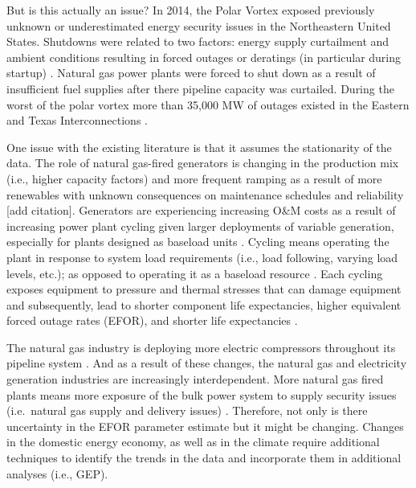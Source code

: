 \documentclass[10pt]{amsart}
\begin{document}
	But is this actually an issue?
	In 2014, the Polar Vortex exposed previously unknown or underestimated energy security issues in the Northeastern United States. 
	Shutdowns were related to two factors: energy supply curtailment and ambient conditions resulting in forced outages or deratings (in particular during startup) \parencite{gugel2015polar}.
	Natural gas power plants were forced to shut down as a result of insufficient fuel supplies after there pipeline capacity was curtailed.
	During the worst of the polar vortex more than 35,000 MW of outages existed in the Eastern and Texas Interconnections \parencite{gugel2015polar}.  
	
	One issue with the existing literature is that it assumes the stationarity of the data. 
	The role of natural gas-fired generators is changing in the production mix (i.e., higher capacity factors) and more frequent ramping as a result of more renewables with unknown consequences on maintenance schedules and reliability [add citation].
	Generators are experiencing increasing O\&M costs as a result of increasing power plant cycling given larger deployments of variable generation, especially for plants designed as baseload units \parencite{nrel:2012aa}. 
	Cycling means operating the plant in response to system load requirements (i.e., load following, varying load levels, etc.); as opposed to operating it as a baseload resource \parencite{nerc:2012aa}.
	Each cycling exposes equipment to pressure and thermal stresses that can damage equipment and subsequently, lead to shorter component life expectancies, higher equivalent forced outage rates (EFOR), and shorter life expectancies \parencite{nerc:2012aa}. 
	 
	The natural gas industry is deploying more electric compressors throughout its pipeline system \parencite{nerc2011gas}. 
	And as a result of these changes, the natural gas and electricity generation industries are increasingly interdependent. 
	More natural gas fired plants means more exposure of the bulk power system to supply security issues (i.e.\ natural gas supply and delivery issues) \parencite{nerc2011gas}.
	Therefore, not only is there uncertainty in the EFOR parameter estimate but it might be changing.
	Changes in the domestic energy economy, as well as in the climate require additional techniques to identify the trends in the data and incorporate them in additional analyses (i.e., GEP).  
	
\end{document}
